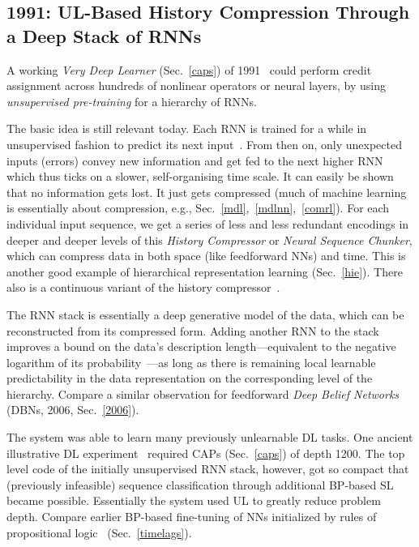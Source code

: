 \documentclass[letterpaper]{article}
\begin{document}
\begin{CJK*}{UTF8}{gbsn}
\begin{sloppypar}
\begin{itemize}
\end{itemize}


\subsection{1991: UL-Based History Compression Through a Deep Stack of RNNs}
\label{1991b}

A working {\em Very Deep Learner} (Sec.~\ref{caps}) of 1991~\citep{chunker91and92,mydeep2013}  could perform credit assignment across hundreds of nonlinear operators or neural layers, by using {\em unsupervised pre-training} for a hierarchy of RNNs.  


The basic idea is still relevant today. Each RNN is trained for a while in unsupervised fashion to predict its next input~\citep[e.g.,][]{connor1994,dorffner1996}. From then on, only unexpected inputs (errors) convey new information and get fed to the next higher RNN which thus ticks on a slower, self-organising time scale. It can easily be shown that no information gets lost. It just gets compressed (much of machine learning is 
essentially about compression, e.g., Sec.~\ref{mdl},~\ref{mdlnn},~\ref{comrl}). For each individual 
input sequence, we get a series of less and less redundant encodings in deeper and deeper levels of this 
{\em History Compressor} or {\em Neural Sequence Chunker}, which can compress data in both space (like feedforward NNs) and time. 
This is another good example of hierarchical representation learning (Sec.~\ref{hie}).
There also is a continuous 
variant of the history compressor~\citep{SchmidhuberMozerPrelinger:93}.

The RNN stack is essentially a deep generative model of the data, 
which can be reconstructed from its compressed form.
Adding another RNN to the stack improves a bound on the data's description length---equivalent to the negative logarithm of its probability~\citep{Huffman:52,Shannon:48}---as long as there is remaining local learnable predictability in the data 
representation on the corresponding level of the hierarchy.
Compare a similar observation for feedforward {\em Deep Belief Networks} (DBNs, 2006, Sec.~\ref{2006}). 

The system was able to learn many previously unlearnable DL tasks.
One ancient illustrative DL experiment~\citep{schmidhuber1993} required 
CAPs (Sec.~\ref{caps}) of depth 1200. 
The top level code of the initially unsupervised RNN stack, however, got so compact that (previously infeasible) sequence classification through additional BP-based SL became possible.
Essentially the system used UL to greatly reduce problem depth. 
Compare earlier BP-based fine-tuning of NNs initialized
by rules of propositional logic~\citep{shavlik1989} (Sec.~\ref{timelags}).


\end{sloppypar}
\end{CJK*}
\end{document}
